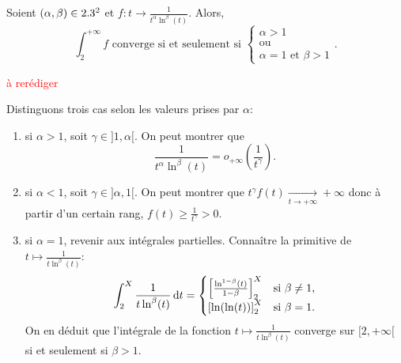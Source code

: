 \begin{prop}
    Soient $(\alpha, \beta) \in  2.3^2$ et $f:t \to \frac{1}{t^{\alpha} \ln^{\beta} (t)}$. Alors,
    $$\int_{2}^{+ \infty} f \text{ converge si et seulement si }
    \begin{cases}
    \alpha > 1 \\
    \text{ou}\\
    \alpha = 1 \text{ et } \beta > 1
    \end{cases}.
    $$
\end{prop}

\textcolor{red}{à rerédiger}
\begin{preuve}
    Distinguons trois cas selon les valeurs prises par $\alpha$:
    \begin{enumerate}
        \item si $\alpha > 1$, soit $\gamma \in ]1, \alpha[$. On peut montrer que $$\displaystyle \frac{1}{t^{\alpha} \ln^{\beta} (t)} = o_{+ \infty} \left( \frac{1}{t^{\gamma}} \right).$$
        \item si $\alpha < 1$, soit $\gamma \in ]\alpha, 1[$. On peut montrer que 
        $ t^{\gamma} f(t) \xrightarrow[t \to + \infty]{} + \infty $
        donc à partir d'un certain rang, $f(t) \geqslant \frac{1}{t^{\gamma}} > 0$.
        \item si $\alpha = 1$, revenir aux intégrales partielles. Connaître la primitive de $t \mapsto \frac{1}{t \ln^{\beta} (t)}$:
        $$\int_{2}^{X} \frac{1}{t \ln^{\beta} (t)} \, \mathrm{d} t = 
        \begin{cases}
            \left[ \frac{\ln ^{1-\beta} (t)}{1-\beta} \right]_2 ^X & \text{si } \beta \not = 1, \\
            \left[\ln (\ln(t)) \right]_2 ^X & \text{si } \beta = 1.
        \end{cases}
        $$
        On en déduit que l'intégrale de la fonction $t \mapsto \frac{1}{t \ln^{\beta} (t)}$ converge sur $[2, + \infty[$ si et seulement si $\beta > 1$.
    \end{enumerate}
\end{preuve}
